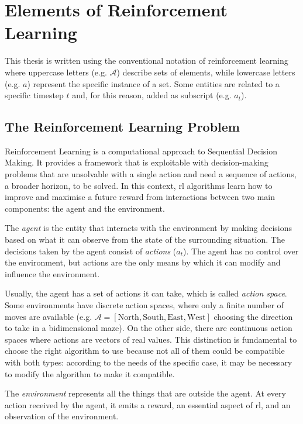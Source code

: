 \section{Elements of Reinforcement Learning}

This thesis is written using the conventional notation of reinforcement learning where uppercase letters (e.g. $\mathcal{A}$) describe sets of elements, while lowercase letters (e.g. $a$) represent the specific instance of a set. Some entities are related to a specific timestep $t$ and, for this reason, added as subscript (e.g. $a_t$).

\subsection{The Reinforcement Learning Problem}

Reinforcement Learning is a computational approach to Sequential Decision Making. It provides a framework that is exploitable with decision-making problems that are unsolvable with a single action and need a sequence of actions, a broader horizon, to be solved. In this context, \acrshort{rl} algorithms learn how to improve and maximise a future reward from interactions between two main components: the agent and the environment. 

The \textit{agent} is the entity that interacts with the environment by making decisions based on what it can observe from the state of the surrounding situation. The decisions taken by the agent consist of \textit{actions} ($a_t$).  The agent has no control over the environment, but actions are the only means by which it can modify and influence the environment.

Usually, the agent has a set of actions it can take, which is called \textit{action space}.
Some environments have discrete action spaces, where only a finite number of moves are available (e.g. $\mathcal{A} = [\text{North}, \text{South}, \text{East}, \text{West}]$ choosing the direction to take in a bidimensional maze). On the other side, there are continuous action spaces where actions are vectors of real values.
This distinction is fundamental to choose the right algorithm to use because not all of them could be compatible with both types: according to the needs of the specific case, it may be necessary to modify the algorithm to make it compatible.

The \textit{environment} represents all the things that are outside the agent. At every action received by the agent, it emits a reward, an essential aspect of \acrshort{rl}, and an observation of the environment.

